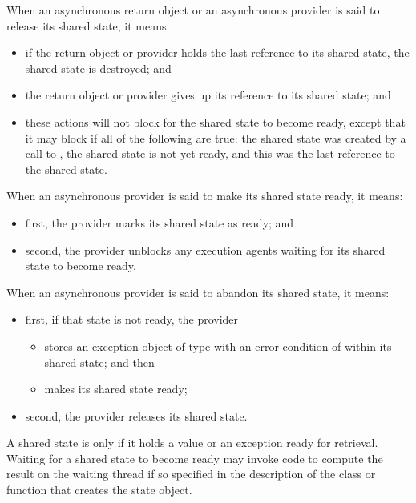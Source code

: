 \pnum
When an asynchronous return object or an asynchronous provider is said to release its
shared state, it means:

\begin{itemize}
\item
if the return object or provider holds the last reference to its shared state,
the shared state is destroyed; and

\item
the return object or provider gives up its reference to its shared state; and

\item these actions will not block for the shared state to become ready, except that it
may block if all of the following are true: the shared state was created by a call to
, the shared state is not yet ready, and this was the last reference
to the shared state.
\end{itemize}

\pnum
When an asynchronous provider is said to make its shared state ready, it means:

\begin{itemize}
\item
first, the provider marks its shared state as ready; and

\item
second, the provider unblocks any execution agents waiting for its shared
state to become ready.
\end{itemize}

\pnum
When an asynchronous provider is said to abandon its shared state, it means:

\begin{itemize}
\item
first, if that state is not ready, the provider

\begin{itemize}
\item
stores an exception object of type  with an error condition of
 within its shared state; and then

\item
makes its shared state ready;
\end{itemize}

\item
second, the provider releases its shared state.
\end{itemize}

\pnum
A shared state is  only if it holds a value or an exception ready for
retrieval.
Waiting for a shared state to become ready may invoke code to compute the result on
the waiting thread if so specified in the description of the class or function that creates
the state object.

